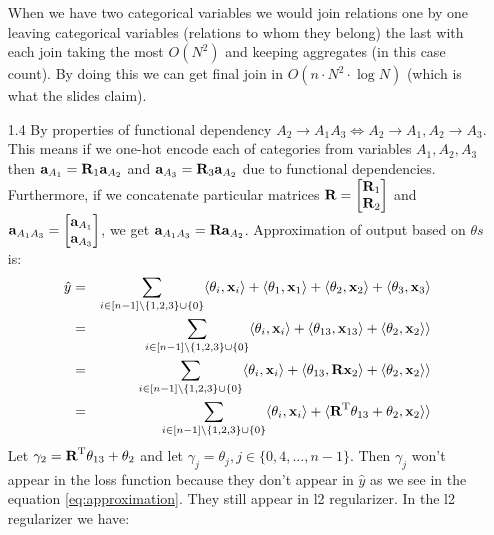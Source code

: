 \documentclass[10pt,a4paper]{article}
\begin{document}
\begin{enumerate}
When we have two categorical variables we would join relations one by one leaving categorical variables (relations to whom they belong) the last with each join taking the most $O(N^2)$ and keeping aggregates (in this case count).  By doing this we can get final join in $O(n \cdot N^2 \cdot \log N)$ (which is what the slides claim).
\item [1.4]
By properties of functional dependency $A_2 \rightarrow A_1A_3 \Leftrightarrow A_2 \rightarrow A_1, A_2\rightarrow A_3$. This means if we one-hot encode each of categories from variables $A_1, A_2, A_3$ then $\textbf{\text{{a}}}_{A_1} = \textbf{\text{{R}}}_1 \textbf{\text{{a}}}_{A_2}$ and $\textbf{\text{{a}}}_{A_3} = \textbf{\text{{R}}}_3 \textbf{\text{{a}}}_{A_2}$ due to functional dependencies. Furthermore, if we concatenate particular matrices $\textbf{\text{{R}}}= \begin{bmatrix}
\textbf{\text{{R}}}_1 \\
\textbf{\text{{R}}}_2
\end{bmatrix}
$  
and 
$\textbf{\text{{a}}}_{A_1A_3}= \begin{bmatrix}
\textbf{\text{{a}}}_{A_1} \\
\textbf{\text{{a}}}_{A_3}
\end{bmatrix}
$, we get $\textbf{\text{{a}}}_{A_1A_3}=\textbf{\text{{R}}}\textbf{\text{{a}}}_{A_2}$. Approximation of output based on $\theta s$ is:
\begin{eqnarray}
\hat{y} &=& 
\sum_{ i\in [n-1] \setminus \{ 1, 2,3 \} \cup \{0\}} \langle \theta_i, \textbf{\text{{x}}}_i \rangle + \langle \theta_1 , \textbf{\text{{x}}}_1 \rangle  + \langle \theta_2 , \textbf{\text{{x}}}_2 \rangle + \langle \theta_3, \textbf{\text{{x}}}_3 \rangle\\
&=&
\sum_{ i\in [n-1] \setminus \{ 1, 2,3 \} \cup \{0\}} \langle \theta_i, \textbf{\text{{x}}}_i \rangle + \langle \theta_{13},\textbf{\text{{x}}}_{13} \rangle  + \langle \theta_2, \textbf{\text{{x}}}_2 \rangle \rangle\\
&=&
\sum_{ i\in [n-1] \setminus \{ 1, 2,3 \}\cup \{0\}} \langle \theta_i, \textbf{\text{{x}}}_i \rangle + \langle \theta_{13},\textbf{\text{{R}}} \textbf{\text{{x}}}_2 \rangle  + \langle \theta_2 ,\textbf{\text{{x}}}_2 \rangle \rangle\\
&=&
\sum_{ i\in [n-1]\setminus \{ 1, 2,3 \} \cup \{0\}} \langle \theta_i, \textbf{\text{{x}}}_i \rangle +   \langle \textbf{\text{{R}}} ^ \text{T} \theta_{13} +\theta_2 ,\textbf{\text{{x}}}_2 \rangle \rangle \label{eq:approximation}\\
\end{eqnarray}
Let $\gamma_2 = \textbf{\text{{R}}} ^ \text{T}\theta_{13} + \theta_2$ and let $\gamma_j = \theta_j, j \in \{0, 4, ..., n-1\}$. Then $\gamma_j$ won't appear in the loss function because they don't appear in $\hat{y}$ as we see in the equation \ref{eq:approximation}. They still appear in l2 regularizer. In the l2 regularizer we have:

\end{enumerate}
\end{document}
